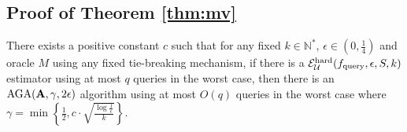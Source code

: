 \subsection{Proof of Theorem \ref{thm:mv}}
\label{subsec:proofmv}
\begin{lemma}
\label{thm:reductionfrombandit}There exists a positive constant $c$ such that for any fixed $k\in \mathbb{N}^*$, $\epsilon\in (0,\frac{1}{4})$ and oracle $M$ using any fixed tie-breaking mechanism, if there is a $\mathcal{E}^{\mathrm{hard}}_{{\mathcal{U}}}(f_{\mathrm{query}},\epsilon,S,k)$ estimator using at most $q$ queries in the worst case, then there is an ${\mathrm{AGA}}(\mathbf A,\gamma,2\epsilon)$ algorithm using at most $O(q)$ queries in the worst case where $\gamma=\min\left\{\frac{1}{2},c\cdot \sqrt{\frac{\log\frac{1}{\epsilon}}{k}}\right\}$.
\end{lemma}


